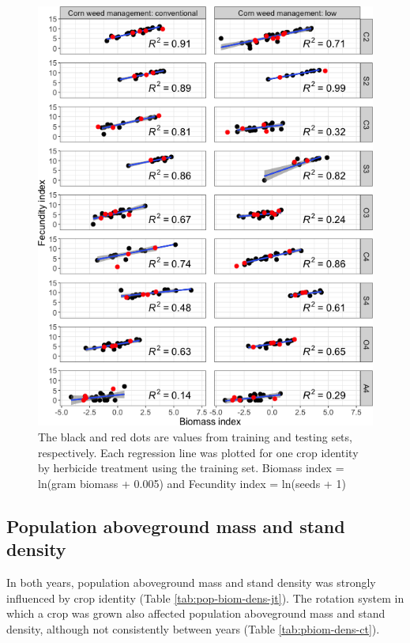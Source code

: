 \documentclass[
]{article}
\begin{document}
\begin{figure}[H]
\includegraphics[width=1\linewidth]{Manuscript_whole_files/figure-latex/full-p-1} \caption{The black and red dots are values from training and testing sets, respectively. Each regression line was plotted for one crop identity by herbicide treatment using the training set. Biomass index = ln(gram biomass + 0.005) and Fecundity index = ln(seeds + 1)}\label{fig:full-p}
\end{figure}

\hypertarget{population-aboveground-mass-and-stand-density}{%
\subsection*{Population aboveground mass and stand density}\label{population-aboveground-mass-and-stand-density}}

In both years, population aboveground mass and stand density was strongly influenced by crop identity (Table \ref{tab:pop-biom-dens-jt}). The rotation system in which a crop was grown also affected population aboveground mass and stand density, although not consistently between years (Table \ref{tab:pbiom-dens-ct}).
\end{document}
